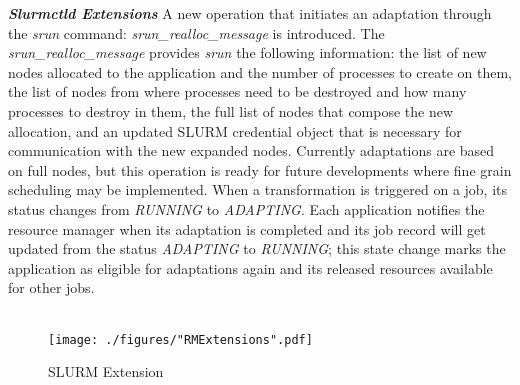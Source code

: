 \textbf{\textit{Slurmctld Extensions}} A new operation that initiates an adaptation through the \textit{srun} command: \textit{srun{\_}realloc{\_}message} is introduced. The \textit{srun{\_}realloc{\_}message} provides \textit{srun} the following information: the list of new nodes allocated to the application and the number of processes to create on them, the list of nodes from where processes need to be destroyed and how many processes to destroy in them, the full list of nodes that compose the new allocation, and an updated SLURM credential object that is necessary for communication with the new expanded nodes. Currently adaptations are based on full nodes, but this operation is ready for future developments where fine grain scheduling may be implemented. When a transformation is triggered on a job, its status changes from \textit{RUNNING} to \textit{ADAPTING}. Each application notifies the resource manager when its adaptation is completed and its job record will get updated from the status \textit{ADAPTING} to \textit{RUNNING}; this state change marks the application as eligible for adaptations again and its released resources available for other jobs.\\ \\
\begin{figure}[t]
\vspace{-0.60cm}
\texttt{[image: ./figures/"RMExtensions".pdf]}
\caption{SLURM Extension}
\label{fig:1}
\end{figure}
